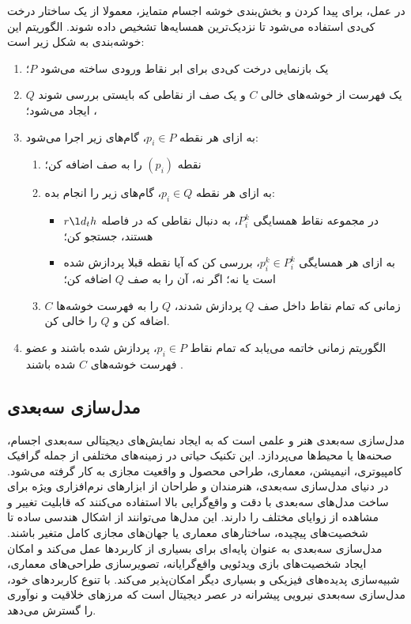 در عمل، برای پیدا کردن و بخش‌بندی خوشه اجسام متمایز،‌ معمولا از یک ساختار درخت کی‌دی استفاده می‌شود تا نزدیک‌‌ترین همسایه‌ها تشخیص داده شوند. الگوریتم این خوشه‌بندی به شکل زیر است:
\begin{enumerate}
    \item یک بازنمایی درخت کی‌دی برای ابر نقاط ورودی ساخته می‌شود $P$؛
    \item یک فهرست از خوشه‌های خالی $C$ و یک صف از نقاطی که بایستی بررسی شوند $Q$، ایجاد می‌شود؛
    \item به ازای هر نقطه $p_i \in P$، گام‌های زیر اجرا می‌شود:
    \begin{enumerate}
        \item نقطه $(p_i)$ را به صف اضافه کن؛
        \item به ازای هر نقطه $p_i \in Q$،‌ گام‌های زیر را انجام بده:
        \begin{itemize}
            \item در مجموعه نقاط همسایگی $P^k_i$، به دنبال نقاطی که در فاصله $r \l d_th$ هستند، جستجو کن؛
            \item به ازای هر همسایگی $p^k_i \in P^k_i$، بررسی کن که آیا نقطه قبلا پردازش شده است یا نه؛ اگر نه، آن را به صف $Q$ اضافه کن؛
        \end{itemize}
        \item زمانی که تمام نقاط داخل صف $Q$ پردازش شدند، $Q$ را به فهرست خوشه‌ها $C$ اضافه کن و $Q$ را خالی کن.
    \end{enumerate}
    \item الگوریتم زمانی خاتمه می‌یابد که تمام نقاط $p_i \in P$، پردازش شده باشند و عضو فهرست خوشه‌های $C$ شده باشند .
\end{enumerate}

\subsection{مدل‌سازی سه‌بعدی}

مدل‌سازی سه‌بعدی هنر و علمی است که به ایجاد نمایش‌های دیجیتالی سه‌بعدی اجسام، صحنه‌ها یا محیط‌ها می‌پردازد. این تکنیک حیاتی در زمینه‌های مختلفی از جمله گرافیک کامپیوتری، انیمیشن، معماری، طراحی محصول و واقعیت مجازی به کار گرفته می‌شود. در دنیای مدل‌سازی سه‌بعدی، هنرمندان و طراحان از ابزارهای نرم‌افزاری ویژه برای ساخت مدل‌های سه‌بعدی با دقت و واقع‌گرایی بالا استفاده می‌کنند که قابلیت تغییر و مشاهده از زوایای مختلف را دارند. این مدل‌ها می‌توانند از اشکال هندسی ساده تا شخصیت‌های پیچیده، ساختارهای معماری یا جهان‌های مجازی کامل متغیر باشند. مدل‌سازی سه‌بعدی به عنوان پایه‌ای برای بسیاری از کاربردها عمل می‌کند و امکان ایجاد شخصیت‌های بازی ویدئویی واقع‌گرایانه، تصویرسازی طراحی‌های معماری، شبیه‌سازی پدیده‌های فیزیکی و بسیاری دیگر امکان‌پذیر می‌کند. با تنوع کاربردهای خود، مدل‌سازی سه‌بعدی نیرویی پیشرانه در عصر دیجیتال است که مرزهای خلاقیت و نوآوری را گسترش می‌دهد.

